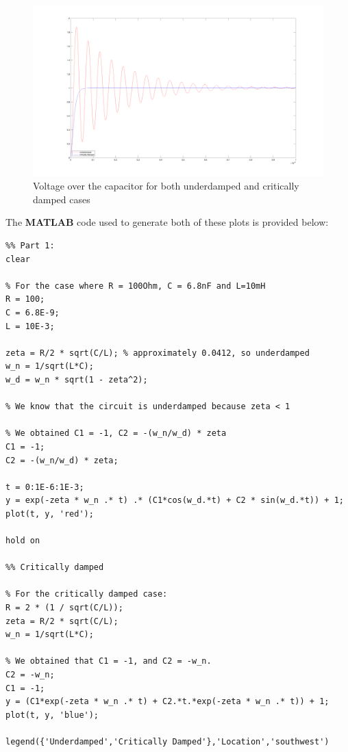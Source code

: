 \begin{figure}[H]
    \centering
    \includegraphics[width=\linewidth]{images/evaluation_vc_full.png}
    \caption{Voltage over the capacitor for both underdamped and critically damped cases}
    \label{fig:evaluation_vc_crit}
\end{figure}

The {\bf MATLAB} code used to generate both of these plots is provided below:
\newpage
\begin{verbatim}
%% Part 1:
clear

% For the case where R = 100Ohm, C = 6.8nF and L=10mH
R = 100;
C = 6.8E-9;
L = 10E-3;

zeta = R/2 * sqrt(C/L); % approximately 0.0412, so underdamped
w_n = 1/sqrt(L*C);
w_d = w_n * sqrt(1 - zeta^2);

% We know that the circuit is underdamped because zeta < 1

% We obtained C1 = -1, C2 = -(w_n/w_d) * zeta
C1 = -1;
C2 = -(w_n/w_d) * zeta;

t = 0:1E-6:1E-3;
y = exp(-zeta * w_n .* t) .* (C1*cos(w_d.*t) + C2 * sin(w_d.*t)) + 1;
plot(t, y, 'red');

hold on

%% Critically damped

% For the critically damped case:
R = 2 * (1 / sqrt(C/L));
zeta = R/2 * sqrt(C/L);
w_n = 1/sqrt(L*C);

% We obtained that C1 = -1, and C2 = -w_n.
C2 = -w_n;
C1 = -1;
y = (C1*exp(-zeta * w_n .* t) + C2.*t.*exp(-zeta * w_n .* t)) + 1;
plot(t, y, 'blue');

legend({'Underdamped','Critically Damped'},'Location','southwest')
\end{verbatim}

